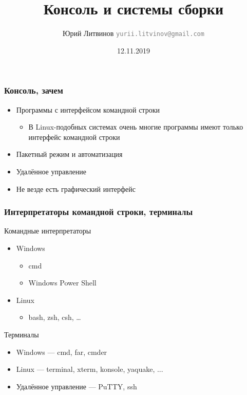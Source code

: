 \documentclass[xetex,mathserif,serif]{beamer}
\title{Консоль и системы сборки}
\author[Юрий Литвинов]{Юрий Литвинов \newline \textcolor{gray}{\small\texttt{yurii.litvinov@gmail.com}}}
\date{12.11.2019}
\begin{document}
	
	\frame{\titlepage}

	\begin{frame}
		\frametitle{Консоль, зачем}
		\begin{itemize}
			\item Программы с интерфейсом командной строки
			\begin{itemize}
				\item В Linux-подобных системах очень многие программы имеют только интерфейс командной строки
			\end{itemize}
			\item Пакетный режим и автоматизация
			\item Удалённое управление
			\item Не везде есть графический интерфейс
		\end{itemize}
	\end{frame}

	\begin{frame}
		\frametitle{Интерпретаторы командной строки, терминалы}
		Командные интерпретаторы
		\begin{itemize}
			\item Windows
			\begin{itemize}
				\item cmd
				\item Windows Power Shell
			\end{itemize}
			\item Linux
			\begin{itemize}
				\item bash, zsh, csh, …
			\end{itemize}
		\end{itemize}
		Терминалы
		\begin{itemize}
			\item Windows --- cmd, far, cmder
			\item Linux --- terminal, xterm, konsole, yaquake, ...
			\item Удалённое управление --- PuTTY, ssh
		\end{itemize}
	\end{frame}
\end{document}
